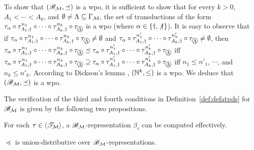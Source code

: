 To show that $({\mathscr{B} }_{\mathcal{M} }, \preceq)$ is a wpo, it is sufficient to show that for every $k > 0$, $A_1 < \cdots < A_k$, and $\emptyset \neq \Lambda \subseteq \Gamma_{\mathcal{M} }$, the set of transductions of the form $\tau_{\alpha} \circ \tau^{n_1}_{A_1, \dag} \circ \cdots \circ \tau^{n_k}_{A_k, \dag} \circ \tau_{\mathcircled{\Lambda}}$  is a wpo (where $\alpha \in \{\dag, \not \dag\}$).  
%
It is easy to observe that if $\tau_{\alpha} \circ \tau^{n_1}_{A_1, \dag} \circ \cdots \circ \tau^{n_k}_{A_k, \dag} \circ \tau_{\mathcircled{\Lambda}} \neq \emptyset$ and $\tau_{\alpha} \circ \tau^{n'_1}_{A_1, \dag} \circ \cdots \circ \tau^{n'_k}_{A_k, \dag} \circ \tau_{\mathcircled{\Lambda}} \neq \emptyset$, 
then 
$\tau_{\alpha} \circ \tau^{n_1}_{A_1, \dag} \circ \cdots \circ \tau^{n_k}_{A_k, \dag} \circ \tau_{\mathcircled{\Lambda}} \preceq \tau_{\alpha} \circ \tau^{n'_1}_{A_1, \dag} \circ \cdots \circ \tau^{n'_k}_{A_k, \dag} \circ \tau_{\mathcircled{\Lambda}}$ iff $\tau_{\alpha} \circ \tau^{n_1}_{A_1, \dag} \circ \cdots \circ \tau^{n_k}_{A_k, \dag} \circ \tau_{\mathcircled{\Lambda}} \supseteq \tau_{\alpha} \circ \tau^{n'_1}_{A_1, \dag} \circ \cdots \circ \tau^{n'_k}_{A_k, \dag} \circ \tau_{\mathcircled{\Lambda}}$ iff $n_1 \le n'_1$, $\cdots$, and $n_k \le n'_k$. According to Dickson's lemma \cite{Kruskal72,Milner1985},  $(\mathbb{N}^k, \leq)$ is a wpo. We deduce that  $({\mathscr{B} }_{\mathcal{M} }, \preceq)$ is a wpo.

The verification of the third and fourth conditions in Definition~\ref{def:defatpds} for ${\mathscr{B} }_{\mathcal{M} }$ is given by the following two propositions.

\begin{proposition}\label{prop-tranbasis-ef}
For each $\tau \in \langle {\mathscr{T} }_{\mathcal{M} } \rangle$, a ${\mathscr{B} }_{\mathcal{M} }$-representation $\beta_\tau$ can be computed effectively.
\end{proposition}

\begin{proposition}\label{prop-tranbasis-udist}
$\preceq$ is union-distributive over ${\mathscr{B} }_{\mathcal{M} }$-representations.
\end{proposition}


